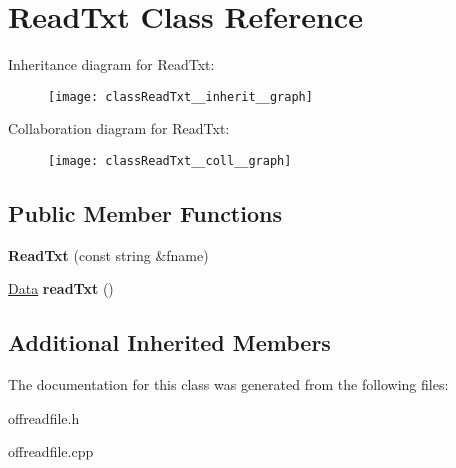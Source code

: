 \hypertarget{classReadTxt}{}\section{Read\+Txt Class Reference}
\label{classReadTxt}


Inheritance diagram for Read\+Txt\+:
\nopagebreak
\begin{figure}[H]
\begin{center}
\leavevmode
\texttt{[image: classReadTxt\_\_inherit\_\_graph]}
\end{center}
\end{figure}


Collaboration diagram for Read\+Txt\+:
\nopagebreak
\begin{figure}[H]
\begin{center}
\leavevmode
\texttt{[image: classReadTxt\_\_coll\_\_graph]}
\end{center}
\end{figure}
\subsection*{Public Member Functions}
\begin{DoxyCompactItemize}
\item 
\mbox{\label{classReadTxt_af66a9abde28671c08264b28c26646c2a}} 
{\bfseries Read\+Txt} (const string \&fname)
\item 
\mbox{\label{classReadTxt_adee9ad45d93fce109d24edaaa834a568}} 
\hyperlink{structData}{Data} {\bfseries read\+Txt} ()
\end{DoxyCompactItemize}
\subsection*{Additional Inherited Members}


The documentation for this class was generated from the following files\+:\begin{DoxyCompactItemize}
\item 
offreadfile.\+h\item 
offreadfile.\+cpp\end{DoxyCompactItemize}
